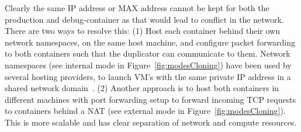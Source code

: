 





\iffalse
Clearly the same IP address or MAX address cannot be kept for both the production and debug-container as that would lead to conflict in the network. 
There are two ways to resolve this: 
(1) Host each container behind their own network namespaces, on the same host machine, and configure packet forwarding to both containers such that the duplicator can communicate to them. 
Network namespaces (see internal mode in Figure~\ref{fig:modesCloning}) 
have been used by several hosting providers, to launch VM's with the 
same private IP address in a shared network domain~\cite{OpenStack}. 
(2) Another approach is to host both containers in different machines with port forwarding setup to forward incoming TCP requests to containers behind a NAT (see external mode in Figure~\ref{fig:modesCloning}). 
This is more scalable and has clear separation of network and compute resources. 

